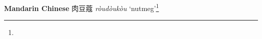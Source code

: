 \begin{etymology}\label{ety:roudoukou}
\textbf{Mandarin Chinese} {肉豆蔻} \textit{ròudòukòu} `nutmeg'\footnote{}
\end{etymology}